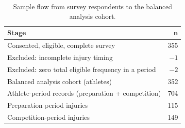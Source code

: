 \begin{table}[htbp]
\centering
\caption{Sample flow from survey respondents to the balanced analysis cohort.}
\label{tab:sample-flow}
\begin{tabular}{lr}
\toprule
Stage & n \\
\midrule
Consented, eligible, complete survey & 355 \\
\quad Excluded: incomplete injury timing & $-1$ \\
\quad Excluded: zero total eligible frequency in a period & $-2$ \\
Balanced analysis cohort (athletes) & 352 \\
Athlete-period records (preparation + competition) & 704 \\
\midrule
Preparation-period injuries & 115 \\
Competition-period injuries & 149 \\
\bottomrule
\end{tabular}
\end{table}

